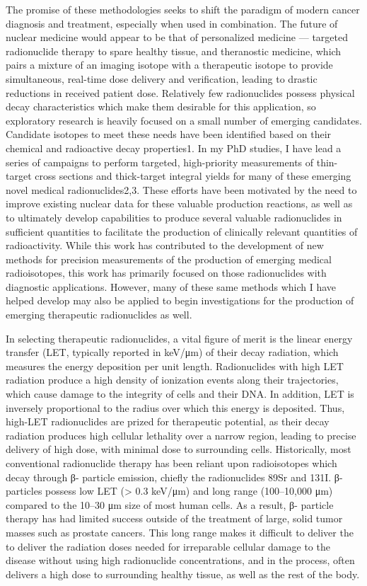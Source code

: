 The promise of these methodologies seeks to shift the paradigm of modern cancer diagnosis and treatment, especially when used in combination. The future of nuclear medicine would appear to be that of personalized medicine — targeted radionuclide therapy to spare healthy tissue, and theranostic medicine, which pairs a mixture of an imaging isotope with a therapeutic isotope to provide simultaneous, real-time dose delivery and verification, leading to drastic reductions in received patient dose. Relatively few radionuclides possess physical decay characteristics which make them desirable for this application, so exploratory research is heavily focused on a small number of emerging candidates. Candidate isotopes to meet these needs have been identified based on their chemical and radioactive decay properties1. In my PhD studies, I have lead a series of campaigns to perform targeted, high-priority measurements of thin-target cross sections and thick-target integral yields for many of these emerging novel medical radionuclides2,3. These efforts have been motivated by the need to improve existing nuclear data for these valuable production reactions, as well as to ultimately develop capabilities to produce several valuable radionuclides in sufficient quantities to facilitate the production of clinically relevant quantities of radioactivity. While this work has contributed to the development of new methods for precision measurements of the production of emerging medical radioisotopes, this work has primarily focused on those radionuclides with diagnostic applications. However, many of these same methods which I have helped develop may also be applied to begin investigations for the production of emerging therapeutic radionuclides as well. 

In selecting therapeutic radionuclides, a vital figure of merit is the linear energy transfer (LET, typically reported in keV/μm) of their decay radiation, which measures the energy deposition per unit length. Radionuclides with high LET radiation produce a high density of ionization events along their trajectories, which cause damage to the integrity of cells and their DNA. In addition, LET is inversely proportional to the radius over which this energy is deposited. Thus, high-LET radionuclides are prized for therapeutic potential, as their decay radiation produces high cellular lethality over a narrow region, leading to precise delivery of high dose, with minimal dose to surrounding cells. Historically, most conventional radionuclide therapy has been reliant upon radioisotopes which decay through β- particle emission, chiefly the radionuclides 89Sr and 131I. β- particles possess low LET (> 0.3 keV/μm) and long range (100–10,000 μm) compared to the 10–30 μm size of most human cells. As a result, β- particle therapy has had limited success outside of the treatment of large, solid tumor masses such as prostate cancers. This long range makes it difficult to deliver the to deliver the radiation doses needed for irreparable cellular damage to the disease without using high radionuclide concentrations, and in the process, often delivers a high dose to surrounding healthy tissue, as well as the rest of the body. 


